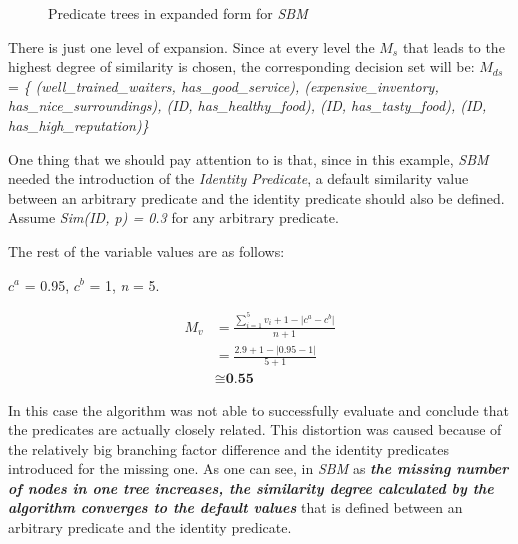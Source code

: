 \begin{figure}[h!]
\begin{center}
\end{center}
\caption{Predicate trees in expanded form for \textit{SBM}}
\label{fig:res2}
\end{figure}

There is just one level of expansion. Since at every level the $M_{s}$ that leads to the highest degree of similarity is chosen, the corresponding decision set will be: $M_{ds}$ = \textit{\{ (well\_trained\_waiters, has\_good\_service), (expensive\_inventory, has\_nice\_surroundings), (ID, has\_healthy\_food), (ID, has\_tasty\_food), (ID, has\_high\_reputation)\}}

One thing that we should pay attention to is that, since in this example, \textit{SBM} needed the introduction of the \textit{Identity Predicate}, a default similarity value  between an arbitrary predicate and the identity predicate should also be defined. Assume \textit{Sim(ID, p) = 0.3} for any arbitrary predicate.  

The rest of the variable values are as follows:

$c^a$ = 0.95, $c^b$ = 1,   \textit{n} = 5.     

\begin{equation}\label{eq:sbmE3}
\begin{split}
M_v &=\frac{\sum_{i=1}^{5} v_i+1-\lvert c^a-c^b\rvert}{n+1}\\
&=\frac{2.9 +1-\lvert 0.95 - 1\rvert}{5+1}\\
&\cong{\textbf{0.55}}
 \end{split} 
\end{equation}

In this case the algorithm was not able to successfully evaluate and conclude that the predicates are actually closely related. This distortion was caused because of the relatively big branching factor difference and the identity predicates introduced for the missing one. As one can see, in \textit{SBM} as \textit{\textbf{the missing number of nodes in one tree increases,  the similarity degree calculated by the algorithm converges to the default values}} that is defined between an arbitrary predicate and the identity predicate.

